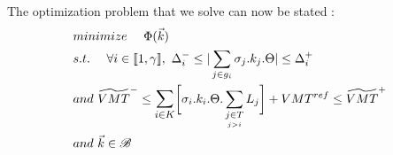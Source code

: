 The optimization problem that we solve can now be stated :\\
\begin{align}
	&minimize\ \ \ \ \Phi(\vec{k}) \\
	&s.t.\ \ \ \ 	\forall i\in \llbracket 1,\gamma \rrbracket,\ \Delta_{i}^{-}\leq |\sum\limits_{j\in g_{i}}\sigma_{j}.k_{j}.\Theta| \leq \Delta_{i}^{+} \nonumber\\
	&and\ \widetilde{VMT}^{-}\leq\mathlarger{\sum\limits_{i\in K}}\biggl[\sigma_{i}.k_{i}.\Theta.	\sum\limits_{\underset{j>i}{j\in T}}L_{j}\biggr]+VMT^{ref}\leq \widetilde{VMT}^{+}\nonumber \\	
	&and\ \vec{k} \in \mathscr{B} \nonumber
\end{align}
